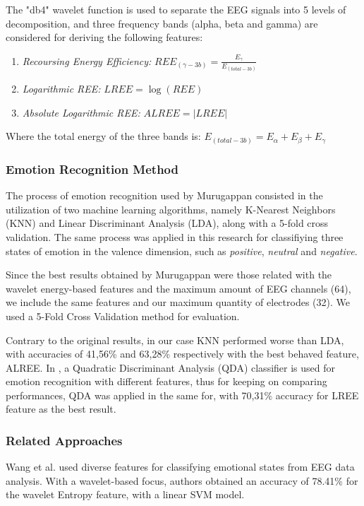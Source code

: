 \documentclass{sig-alternate}
\begin{document}
The "db4" wavelet function is used to separate the EEG signals into 5 levels of decomposition, and three frequency bands (alpha, beta and gamma) are considered for deriving the following features:

\begin{enumerate}
\item \textit{Recoursing Energy Efficiency: } $REE_(\gamma-3b) = \frac{E_\gamma}{E_(total-3b)}$ 

\item \textit{Logarithmic REE: } $LREE = \log(REE)$
\item \textit{Absolute Logarithmic REE: } $ALREE = \mathopen|LREE\mathclose|$

\end{enumerate}

Where the total energy of the three bands is:
$E_(total-3b) = E_\alpha + E_\beta + E_\gamma$

\subsubsection{Emotion Recognition Method}

The process of emotion recognition used by Murugappan consisted in the utilization of two machine learning algorithms, namely K-Nearest Neighbors (KNN) and Linear Discriminant Analysis (LDA), along with a 5-fold cross validation. The same process was applied in this research for classifiying three states of emotion in the valence dimension, such as \emph{positive}, \emph{neutral} and \emph{negative}.

Since the best results obtained by Murugappan were those related with the wavelet energy-based features and the maximum amount of EEG channels (64), we include the same features and our maximum quantity of electrodes (32). We used a 5-Fold Cross Validation method for evaluation.

Contrary to the original results, in our case KNN performed worse than LDA, with accuracies of 41,56\% and 63,28\% respectively with the best behaved feature, ALREE. In \cite{jenke2014feature}, a Quadratic Discriminant Analysis (QDA) classifier is used for emotion recognition with different features, thus for keeping on comparing performances, QDA was applied in the same for, with 70,31\% accuracy for LREE feature as the best result.

\subsubsection{Related Approaches}
Wang et al. \cite{wang2014} used diverse features for classifying emotional states from EEG data analysis. With a wavelet-based focus, authors obtained an accuracy of 78.41\% for the wavelet Entropy feature, with a linear SVM model.
\end{document}
